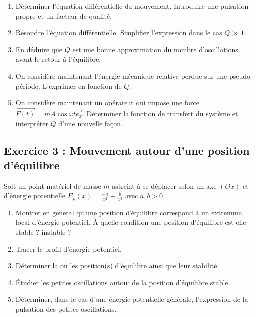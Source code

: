 \begin{enumerate}
	\item Déterminer l'équation différentielle du mouvement. Introduire une pulsation propre et un facteur de qualité.
	\item Résoudre l'équation différentielle. Simplifier l'expression dans le cas $Q \gg 1$.
	\item En déduire que $Q$ est une bonne approximation du nombre d'oscillations avant le retour à l'équilibre.
	\item On considère maintenant l'énergie mécanique relative perdue sur une pseudo-période. L'exprimer en fonction de $Q$. 
	\item On considère maintenant un opérateur qui impose une force $\vec{F(t)} = m A \cos{\omega t} \vec{e_x}$. Déterminer la fonction de transfert du système et interpréter $Q$ d'une nouvelle façon.
\end{enumerate}

\subsection{Exercice 3 : Mouvement autour d'une position d'équilibre}

Soit un point matériel de masse $m$ astreint à se déplacer selon un axe $(Ox)$ et d'énergie potentielle $E_p(x) = \frac{-a}{x^2} + \frac{b}{x^3}$ avec $a, b > 0$.

\begin{enumerate}
	\item Montrer en général qu'une position d'équilibre correspond à un extremum local d'énergie potentiel. À quelle condition une position d'équilibre est-elle stable ? instable ?
	\item Tracer le profil d'énergie potentiel.
	\item Déterminer la ou les position(s) d'équilibre ainsi que leur stabilité.
	\item Étudier les petites oscillations autour de la position d'équilibre stable.
	\item Déterminer, dans le cas d'une énergie potentielle générale, l'expression de la pulsation des petites oscillations.
\end{enumerate}
